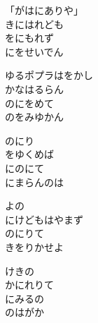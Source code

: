 \documentclass[10pt,b5j]{tarticle} %
\begin{document}
\vspace{1.5em} %
\newcommand{\linespace}{0.5em} %
\newcommand{\blocksize}{0.5\hsize} %
\begin{enumerate} %
    \begin{minipage}[c]{\blocksize}
    
        \vspace{\linespace}
        \item
        「がはにありや」\\
        きにはれども\\
        をにもれず\\
        にをせいでん
        
        \vspace{\linespace}
        \item
        ゆるポプラはをかし\\
        かなはるらん\\
        のにをめて\\
        のをみゆかん
        
        \vspace{\linespace}
        \item
        のにり\\
        をゆくめば\\
        にのにて\\
        にまらんのは
        
        \vspace{\linespace}
        \item
        よの\\
        にけどもはやまず\\
        のにりて\\
        きをりかせよ
        
        \vspace{\linespace}
        \item
        けきの\\
        かにれりて\\
        にみるの\\
        のはがか
    
    \end{minipage}
\end{enumerate} %
\end{document}
